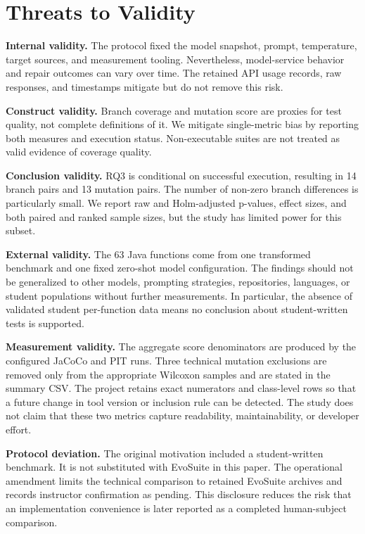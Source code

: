 \section{Threats to Validity}
\label{sec:threats}

\textbf{Internal validity.} The protocol fixed the model snapshot, prompt, temperature, target sources, and measurement tooling. Nevertheless, model-service behavior and repair outcomes can vary over time. The retained API usage records, raw responses, and timestamps mitigate but do not remove this risk.

\textbf{Construct validity.} Branch coverage and mutation score are proxies for test quality, not complete definitions of it. We mitigate single-metric bias by reporting both measures and execution status. Non-executable suites are not treated as valid evidence of coverage quality.

\textbf{Conclusion validity.} RQ3 is conditional on successful execution, resulting in 14 branch pairs and 13 mutation pairs. The number of non-zero branch differences is particularly small. We report raw and Holm-adjusted p-values, effect sizes, and both paired and ranked sample sizes, but the study has limited power for this subset.

\textbf{External validity.} The 63 Java functions come from one transformed benchmark and one fixed zero-shot model configuration. The findings should not be generalized to other models, prompting strategies, repositories, languages, or student populations without further measurements. In particular, the absence of validated student per-function data means no conclusion about student-written tests is supported.

\textbf{Measurement validity.} The aggregate score denominators are produced by the configured JaCoCo and PIT runs. Three technical mutation exclusions are removed only from the appropriate Wilcoxon samples and are stated in the summary CSV. The project retains exact numerators and class-level rows so that a future change in tool version or inclusion rule can be detected. The study does not claim that these two metrics capture readability, maintainability, or developer effort.

\textbf{Protocol deviation.} The original motivation included a student-written benchmark. It is not substituted with EvoSuite in this paper. The operational amendment limits the technical comparison to retained EvoSuite archives and records instructor confirmation as pending. This disclosure reduces the risk that an implementation convenience is later reported as a completed human-subject comparison.
